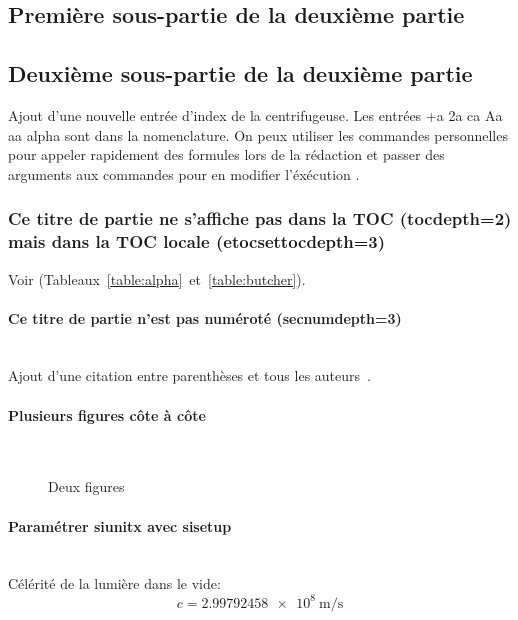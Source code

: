 	\subsection{Première sous-partie de la deuxième partie}

		\lipsum[4]

	\subsection[Sous-partie 2]{Deuxième sous-partie de la deuxième partie} %

		Ajout d'une nouvelle entrée d'index de la centrifugeuse. Les entrées \gls{+a} \gls{2a} \gls{ca} \gls{Aa} \gls{aa} \gls{alpha} {\NoAutoSpaceBeforeFDP}sont dans la nomenclature. On peux utiliser les commandes personnelles pour appeler rapidement des formules lors de la rédaction \acc et passer des arguments aux commandes pour en modifier l'éxécution \emiss[\nu]{\Omega}.
		
		\subsubsection{Ce titre de partie ne s'affiche pas dans la TOC (tocdepth=2) mais dans la TOC locale (etocsettocdepth=3)}

			Voir (Tableaux~\ref{table:alpha}~et~\ref{table:butcher}).

			\paragraph{Ce titre de partie n'est pas numéroté (secnumdepth=3)}~~\\ %

				Ajout d'une citation entre parenthèses et tous les auteurs~\parencite{zohdy_mapping_2012}.

			\paragraph{Plusieurs figures côte à côte}~~\\

				\lipsum[66]


				\begin{figure}
					\centering
					\caption{Deux figures}
					\label{fig:deux_figures}
				\end{figure}

			\paragraph{Paramétrer siunitx avec sisetup}~~\\
			
        		Célérité de la lumière dans le vide: $$c=\SI{2.99792458e8}{\meter\per\second}$$
